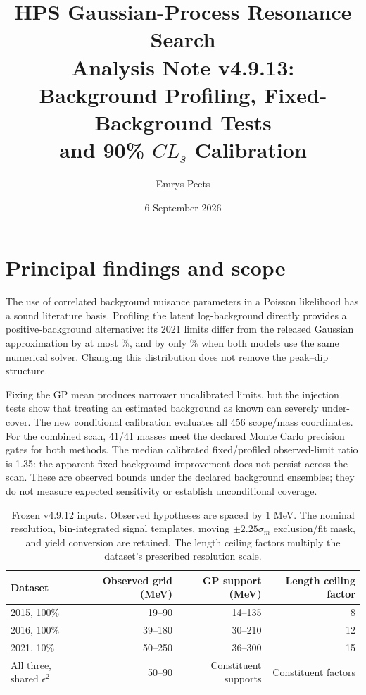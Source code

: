\documentclass[11pt]{article}
\title{HPS Gaussian-Process Resonance Search\\
Analysis Note v4.9.13:\\Background Profiling, Fixed-Background Tests\\and 90\% $CL_s$ Calibration}
\author{Emrys Peets}
\date{6 September 2026}
\newcommand{\eps}{\ensuremath{\epsilon}}
\begin{document}
\maketitle
\begin{center}
\end{center}

\section{Principal findings and scope}

The use of correlated background nuisance parameters in a Poisson likelihood
has a sound literature basis. Profiling the latent log-background directly
provides a positive-background alternative: its 2021 limits differ from the
released Gaussian approximation by at most \LogReleaseMax\%, and by only
\LogControlMax\% when both models use the same numerical solver. Changing this
distribution does not remove the peak--dip structure.

Fixing the GP mean produces narrower uncalibrated limits, but the injection tests show that treating an estimated background as known can severely under-cover. The new conditional calibration evaluates all 456 scope/mass coordinates. For the combined scan, 41/41 masses meet the declared Monte Carlo precision gates for both methods. The median calibrated fixed/profiled observed-limit ratio is 1.35: the apparent fixed-background improvement does not persist across the scan. These are observed bounds under the declared background ensembles; they do not measure expected sensitivity or establish unconditional coverage.

\begin{table}[H]\centering\small
\begin{tabular}{lrrr}\toprule
Dataset & Observed grid (MeV) & GP support (MeV) & Length ceiling factor\\\midrule
2015, 100\% & 19--90 & 14--135 & 8\\
2016, 100\% & 39--180 & 30--210 & 12\\
2021, 10\% & 50--250 & 36--300 & 15\\
All three, shared $\eps^2$ & 50--90 & Constituent supports & Constituent factors\\
\bottomrule\end{tabular}
\caption{Frozen v4.9.12 inputs. Observed hypotheses are spaced by 1 MeV.
The nominal resolution, bin-integrated signal templates, moving
$\pm2.25\sigma_m$ exclusion/fit mask, and yield conversion are retained.
The length ceiling factors multiply the dataset's prescribed resolution scale.}
\label{tab:inputs}\end{table}
\end{document}
